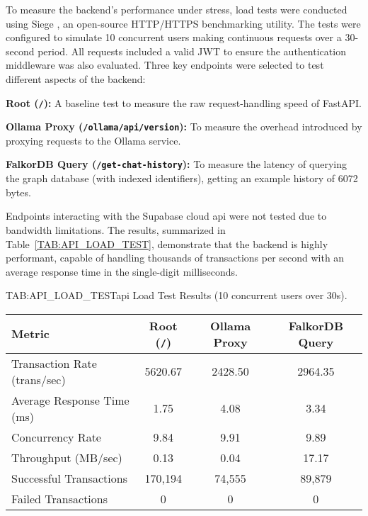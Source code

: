 To measure the backend's performance under stress, load tests were conducted using Siege \cite{SIEGE}, an open-source HTTP/HTTPS benchmarking utility. The tests were configured to simulate 10 concurrent users making continuous requests over a 30-second period. All requests included a valid JWT to ensure the authentication middleware was also evaluated. Three key endpoints were selected to test different aspects of the backend:

\begin{compactitem}[\textbullet]
    \item \textbf{Root (\texttt{/}):} A baseline test to measure the raw request-handling speed of FastAPI.
    \item \textbf{Ollama Proxy (\texttt{/ollama/api/version}):} To measure the overhead introduced by proxying requests to the Ollama service.
    \item \textbf{FalkorDB Query (\texttt{/get-chat-history}):} To measure the latency of querying the graph database (with indexed identifiers), getting an example history of 6072 bytes.
\end{compactitem}

Endpoints interacting with the Supabase cloud \acs{api} were not tested due to bandwidth limitations. The results, summarized in Table~\ref{TAB:API_LOAD_TEST}, demonstrate that the backend is highly performant, capable of handling thousands of transactions per second with an average response time in the single-digit milliseconds.

\begin{table}[Load Test Results]{TAB:API_LOAD_TEST}{\acs{api} Load Test Results (10 concurrent users over 30s).}
    \centering
    \begin{tabular}{l c c c}
        \hline
        \textbf{Metric} & \textbf{Root (\texttt{/})} & \textbf{Ollama Proxy} & \textbf{FalkorDB Query} \\
        \hline\hline
        Transaction Rate (trans/sec) & 5620.67 & 2428.50 & 2964.35 \\
        Average Response Time (ms) & 1.75 & 4.08 & 3.34 \\
        Concurrency Rate & 9.84 & 9.91 & 9.89 \\
        Throughput (MB/sec) & 0.13 & 0.04 & 17.17 \\
        Successful Transactions & 170,194 & 74,555 & 89,879 \\
        Failed Transactions & 0 & 0 & 0 \\
        \hline
    \end{tabular}
\end{table}
